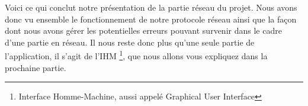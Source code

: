 	Voici ce qui conclut notre présentation de la partie réseau du projet. Nous avons donc vu ensemble le fonctionnement de notre protocole réseau ainsi que la façon dont nous avons gérer les potentielles erreurs pouvant survenir dans le cadre d'une partie en réseau. Il nous reste donc plus qu'une seule partie de l'application, il s'agit de l'IHM \footnote{Interface Homme-Machine, aussi appelé Graphical User Interface}, que nous allons vous expliquez dans la prochaine partie.
